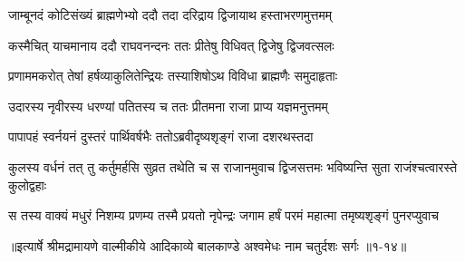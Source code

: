 \twolineshloka
{जाम्बूनदं कोटिसंख्यं ब्राह्मणेभ्यो ददौ तदा}
{दरिद्राय द्विजायाथ हस्ताभरणमुत्तमम्} %

\twolineshloka
{कस्मैचित् याचमानाय ददौ राघवनन्दनः}
{ततः प्रीतेषु विधिवत् द्विजेषु द्विजवत्सलः} %

\twolineshloka
{प्रणाममकरोत् तेषां हर्षव्याकुलितेन्द्रियः}
{तस्याशिषोऽथ विविधा ब्राह्मणैः समुदाहृताः} %

\twolineshloka
{उदारस्य नृवीरस्य धरण्यां पतितस्य च}
{ततः प्रीतमना राजा प्राप्य यज्ञमनुत्तमम्} %

\twolineshloka
{पापापहं स्वर्नयनं दुस्तरं पार्थिवर्षभैः}
{ततोऽब्रवीदृष्यशृङ्गं राजा दशरथस्तदा} %

\threelineshloka
{कुलस्य वर्धनं तत् तु कर्तुमर्हसि सुव्रत}
{तथेति च स राजानमुवाच द्विजसत्तमः}
{भविष्यन्ति सुता राजंश्चत्वारस्ते कुलोद्वहाः} %

\twolineshloka
{स तस्य वाक्यं मधुरं निशम्य प्रणम्य तस्मै प्रयतो नृपेन्द्रः}
{जगाम हर्षं परमं महात्मा तमृष्यशृङ्गं पुनरप्युवाच} %


॥इत्यार्षे श्रीमद्रामायणे वाल्मीकीये आदिकाव्ये बालकाण्डे अश्वमेधः नाम चतुर्दशः सर्गः ॥१-१४॥
